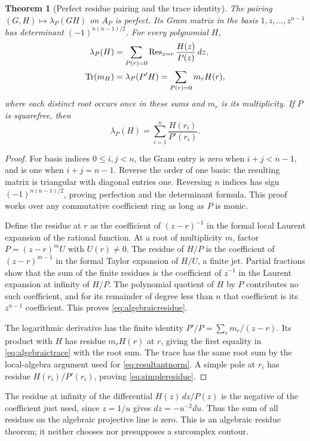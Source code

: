 \documentclass[11pt,letterpaper,oneside]{article}
\numberwithin{equation}{section}
\newtheorem{theorem}{Theorem}[section]
\theoremstyle{definition}
\theoremstyle{remark}\newtheorem{remark}[theorem]{Remark}
\newcommand{\Res}{\operatorname{Res}}\newcommand{\Disc}{\operatorname{Disc}}
\begin{document}
\begin{theorem}[Perfect residue pairing and the trace identity]\label{thm:uniduality}
The pairing $(G,H)\mapsto\lambda_P(GH)$ on $A_P$ is perfect. Its Gram
matrix in the basis $1,z,\ldots,z^{n-1}$ has determinant
$(-1)^{n(n-1)/2}$. For every polynomial $H$,
\begin{align}
 \lambda_P(H)&=\sum_{P(r)=0}\Res_{z=r}\frac{H(z)}{P(z)}\,dz,
 \label{eq:algebraicresidue}\\
 \Tr(m_H)&=\lambda_P(P'H)=\sum_{P(r)=0}m_rH(r),
 \label{eq:algebraictrace}
\end{align}
where each distinct root occurs once in these sums and $m_r$ is its
multiplicity. If $P$ is squarefree, then
\begin{equation}\label{eq:simpleresidue}
 \lambda_P(H)=\sum_{i=1}^n\frac{H(r_i)}{P'(r_i)}.
\end{equation}
\end{theorem}
\begin{proof}
For basis indices $0\leq i,j<n$, the Gram entry is zero when
$i+j<n-1$, and is one when $i+j=n-1$. Reverse the order of one basis:
the resulting matrix is triangular with diagonal entries one. Reversing
$n$ indices has sign $(-1)^{n(n-1)/2}$, proving perfection and the
determinant formula. This proof works over any commutative coefficient
ring as long as $P$ is monic.

Define the residue at $r$ as the coefficient of $(z-r)^{-1}$ in the
formal local Laurent expansion of the rational function. At a root of
multiplicity $m$, factor $P=(z-r)^mU$ with $U(r)\ne0$. The residue of
$H/P$ is the coefficient of $(z-r)^{m-1}$ in the formal Taylor expansion
of $H/U$, a finite jet. Partial fractions show that the sum of the
finite residues is the coefficient of $z^{-1}$ in the Laurent expansion
at infinity of $H/P$. The polynomial quotient of $H$ by $P$ contributes
no such coefficient, and for its remainder of degree less than $n$ that
coefficient is its $z^{n-1}$ coefficient. This proves
\eqref{eq:algebraicresidue}.

The logarithmic derivative has the finite identity
$P'/P=\sum_r m_r/(z-r)$. Its product with $H$ has residue $m_rH(r)$
at $r$, giving the first equality in \eqref{eq:algebraictrace} with the
root sum. The trace has the same root sum by the local-algebra argument
used for \eqref{eq:resultantnorm}. A simple pole at $r_i$ has residue
$H(r_i)/P'(r_i)$, proving \eqref{eq:simpleresidue}.
\end{proof}

The residue at infinity of the differential $H(z)\,dz/P(z)$ is the
negative of the coefficient just used, since $z=1/u$ gives
$dz=-u^{-2}du$. Thus the sum of all residues on the algebraic projective
line is zero. This is an algebraic residue theorem; it neither chooses
nor presupposes a surcomplex contour.
\end{document}
